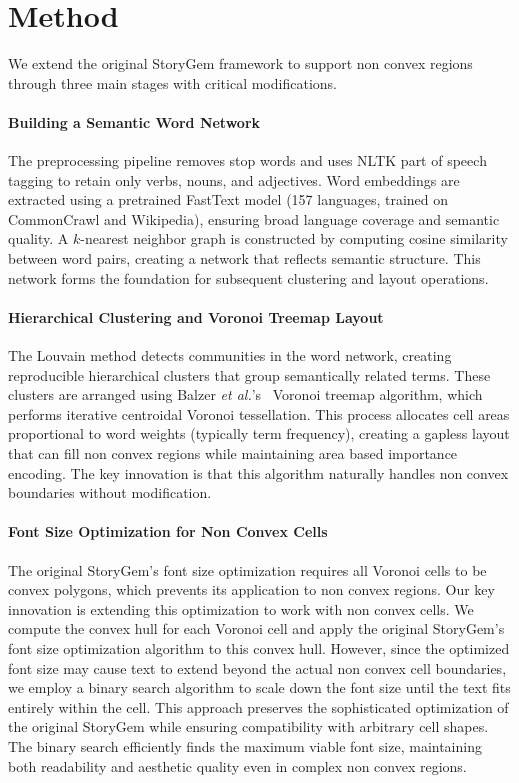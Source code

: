 \documentclass{vgtc}                          %
\newcommand{\etal}{\textit{et al.}}
\begin{document}
\section{Method}

We extend the original StoryGem framework to support non convex regions through three main stages with critical modifications.

\paragraph{Building a Semantic Word Network}
The preprocessing pipeline removes stop words and uses NLTK part of speech tagging to retain only verbs, nouns, and adjectives.
Word embeddings are extracted using a pretrained FastText model (157 languages, trained on CommonCrawl and Wikipedia), ensuring broad language coverage and semantic quality.
A $k$-nearest neighbor graph is constructed by computing cosine similarity between word pairs, creating a network that reflects semantic structure.
This network forms the foundation for subsequent clustering and layout operations.

\paragraph{Hierarchical Clustering and Voronoi Treemap Layout}
The Louvain method detects communities in the word network, creating reproducible hierarchical clusters that group semantically related terms.
These clusters are arranged using Balzer \etal's~\cite{balzer2005voronoi} Voronoi treemap algorithm, which performs iterative centroidal Voronoi tessellation.
This process allocates cell areas proportional to word weights (typically term frequency), creating a gapless layout that can fill non convex regions while maintaining area based importance encoding.
The key innovation is that this algorithm naturally handles non convex boundaries without modification.

\paragraph{Font Size Optimization for Non Convex Cells}
The original StoryGem's font size optimization requires all Voronoi cells to be convex polygons, which prevents its application to non convex regions.
Our key innovation is extending this optimization to work with non convex cells.
We compute the convex hull for each Voronoi cell and apply the original StoryGem's font size optimization algorithm to this convex hull.
However, since the optimized font size may cause text to extend beyond the actual non convex cell boundaries, we employ a binary search algorithm to scale down the font size until the text fits entirely within the cell.
This approach preserves the sophisticated optimization of the original StoryGem while ensuring compatibility with arbitrary cell shapes.
The binary search efficiently finds the maximum viable font size, maintaining both readability and aesthetic quality even in complex non convex regions.
\end{document}
